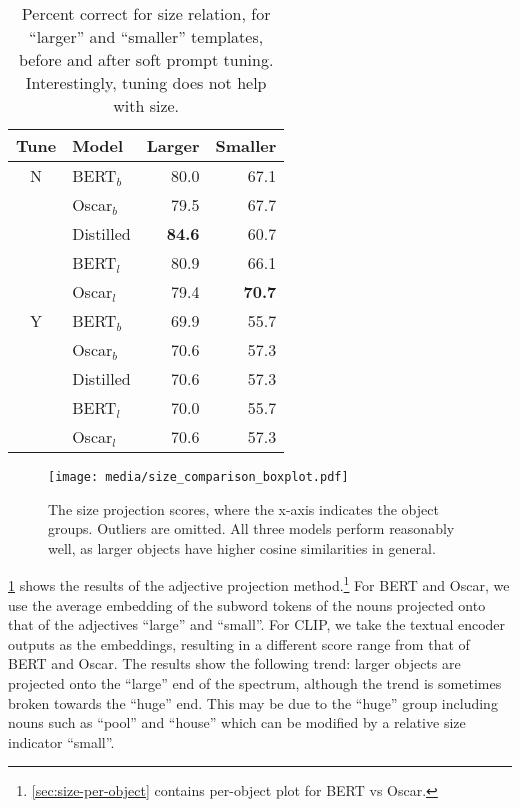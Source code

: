 \documentclass[11pt]{article}
\begin{document}
\begin{table}[t!]
\small
\centering
\begin{tabular}{clrr}
\hline
\textbf{Tune} & \textbf{Model} & \textbf{Larger} & \textbf{Smaller} \\
\hline
N & BERT$_b$ & 80.0 & 67.1 \\
 & Oscar$_b$ & 79.5 & 67.7 \\
 & Distilled & \textbf{84.6} & 60.7 \\
 & BERT$_l$ & 80.9 & 66.1 \\
 & Oscar$_l$ & 79.4 & \textbf{70.7} \\
\hline
Y & BERT$_b$ & 69.9 & 55.7 \\
 & Oscar$_b$ & 70.6 & 57.3 \\
 & Distilled & 70.6 & 57.3 \\
 & BERT$_l$ & 70.0 & 55.7 \\
 & Oscar$_l$ & 70.6 & 57.3 \\
\hline
\end{tabular}
\caption{\label{size_table}
Percent correct for size relation, for ``larger'' and ``smaller'' templates, before and after soft prompt tuning. Interestingly, tuning does not help with size.}
\vspace{-0.6em}
\end{table}

\begin{figure}[t]
    \centering
    \texttt{[image: media/size\_comparison\_boxplot.pdf]}
    \caption{The size projection scores, where the x-axis indicates the object groups. Outliers are omitted. All three models perform reasonably well, as larger objects have higher cosine similarities in general.}
    \label{fig:size_boxplot}
\vspace{-1em}
\end{figure}


\cref{fig:size_boxplot} shows the results of the adjective projection method.\footnote{ \cref{sec:size-per-object} contains per-object plot for BERT vs Oscar.} For BERT and Oscar, we use the average embedding of the subword tokens of the nouns projected onto that of the adjectives ``large'' and ``small''. For CLIP, we take the  textual encoder outputs as the embeddings, resulting in a different score range from that of BERT and Oscar. The results show the following trend: larger objects are projected onto the ``large'' end of the spectrum, although the trend is sometimes broken towards the ``huge'' end. This may be due to the ``huge'' group including nouns such as ``pool'' and ``house'' which can be modified by a relative size indicator ``small''.
\end{document}
